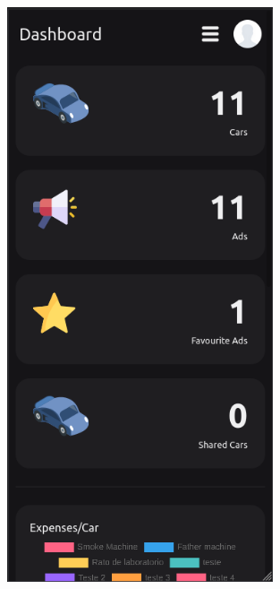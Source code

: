 \documentclass[a4paper]{report}
\begin{document}
\begin{figure}[H]
\centering
\begin{minipage}{.5\textwidth}
  \centering
    \includegraphics[width=0.7\textwidth]{images/dashboard_mobile.png}
\end{minipage}%
\begin{minipage}{.5\textwidth}
  \centering

\end{minipage}
\end{figure}
\end{document}
